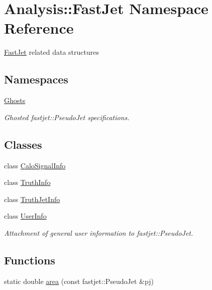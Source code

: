 \hypertarget{namespaceAnalysis_1_1FastJet}{}\section{Analysis\+:\+:Fast\+Jet Namespace Reference}
\label{namespaceAnalysis_1_1FastJet}


{\ttfamily \hyperlink{namespaceAnalysis_1_1FastJet}{Fast\+Jet}} related data structures  


\subsection*{Namespaces}
\begin{DoxyCompactItemize}
\item 
 \hyperlink{namespaceAnalysis_1_1FastJet_1_1Ghosts}{Ghosts}
\begin{DoxyCompactList}\small\item\em Ghosted {\ttfamily fastjet\+::\+Pseudo\+Jet} specifications. \end{DoxyCompactList}\end{DoxyCompactItemize}
\subsection*{Classes}
\begin{DoxyCompactItemize}
\item 
class \hyperlink{classAnalysis_1_1FastJet_1_1CaloSignalInfo}{Calo\+Signal\+Info}
\item 
class \hyperlink{classAnalysis_1_1FastJet_1_1TruthInfo}{Truth\+Info}
\item 
class \hyperlink{classAnalysis_1_1FastJet_1_1TruthJetInfo}{Truth\+Jet\+Info}
\item 
class \hyperlink{classAnalysis_1_1FastJet_1_1UserInfo}{User\+Info}
\begin{DoxyCompactList}\small\item\em Attachment of general user information to {\ttfamily fastjet\+::\+Pseudo\+Jet}. \end{DoxyCompactList}\end{DoxyCompactItemize}
\subsection*{Functions}
\begin{DoxyCompactItemize}
\item 
static double \hyperlink{namespaceAnalysis_1_1FastJet_a39011989fc3200fab3514e41fb072bdb}{area} (const fastjet\+::\+Pseudo\+Jet \&pj)
\end{DoxyCompactItemize}


